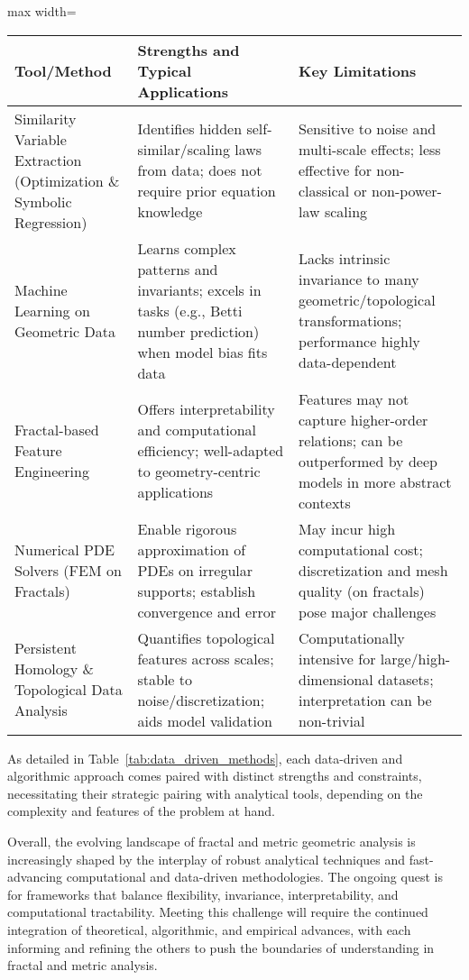 \documentclass[sigconf]{acmart}
\begin{document}
\begin{table*}[htbp]
\centering
\caption{Comparative Summary of Data-driven and Algorithmic Approaches}
\label{tab:data_driven_methods}
\begin{adjustbox}{max width=\textwidth}
\begin{tabular}{lll}
\toprule
\textbf{Tool/Method} & \textbf{Strengths and Typical Applications} & \textbf{Key Limitations} \\
\midrule
Similarity Variable Extraction (Optimization \& Symbolic Regression) & Identifies hidden self-similar/scaling laws from data; does not require prior equation knowledge & Sensitive to noise and multi-scale effects; less effective for non-classical or non-power-law scaling \\
Machine Learning on Geometric Data & Learns complex patterns and invariants; excels in tasks (e.g., Betti number prediction) when model bias fits data & Lacks intrinsic invariance to many geometric/topological transformations; performance highly data-dependent \\
Fractal-based Feature Engineering & Offers interpretability and computational efficiency; well-adapted to geometry-centric applications & Features may not capture higher-order relations; can be outperformed by deep models in more abstract contexts \\
Numerical PDE Solvers (FEM on Fractals) & Enable rigorous approximation of PDEs on irregular supports; establish convergence and error & May incur high computational cost; discretization and mesh quality (on fractals) pose major challenges \\
Persistent Homology \& Topological Data Analysis & Quantifies topological features across scales; stable to noise/discretization; aids model validation & Computationally intensive for large/high-dimensional datasets; interpretation can be non-trivial \\
\bottomrule
\end{tabular}
\end{adjustbox}
\end{table*}

As detailed in Table~\ref{tab:data_driven_methods}, each data-driven and algorithmic approach comes paired with distinct strengths and constraints, necessitating their strategic pairing with analytical tools, depending on the complexity and features of the problem at hand.

Overall, the evolving landscape of fractal and metric geometric analysis is increasingly shaped by the interplay of robust analytical techniques and fast-advancing computational and data-driven methodologies. The ongoing quest is for frameworks that balance flexibility, invariance, interpretability, and computational tractability. Meeting this challenge will require the continued integration of theoretical, algorithmic, and empirical advances, with each informing and refining the others to push the boundaries of understanding in fractal and metric analysis.
\end{document}
